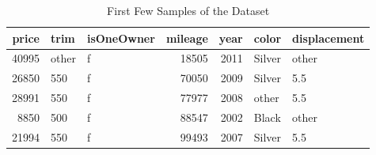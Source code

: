 \begin{table}[ht]
\centering
\begin{tabular}{rllrrll}
  \hline
price & trim & isOneOwner & mileage & year & color & displacement \\ 
  \hline
40995 & other & f & 18505 & 2011 & Silver & other \\ 
  26850 & 550 & f & 70050 & 2009 & Silver & 5.5 \\ 
  28991 & 550 & f & 77977 & 2008 & other & 5.5 \\ 
  8850 & 500 & f & 88547 & 2002 & Black & other \\ 
  21994 & 550 & f & 99493 & 2007 & Silver & 5.5 \\ 
   \hline
\end{tabular}
\caption{First Few Samples of the Dataset} 
\label{tab:head_dat}
\end{table}
